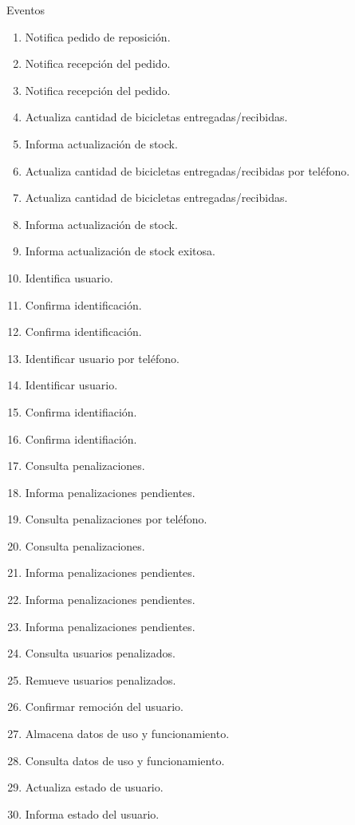 \begin{subsection}{Eventos}
\begin{enumerate}
	\item Notifica pedido de reposición.
	\item Notifica recepción del pedido.
	\item Notifica recepción del pedido.
	\item Actualiza cantidad de bicicletas entregadas/recibidas.
	\item Informa actualización de stock.
	\item Actualiza cantidad de bicicletas entregadas/recibidas por teléfono.
	\item Actualiza cantidad de bicicletas entregadas/recibidas.
	\item Informa actualización de stock.
	\item Informa actualización de stock exitosa.
	\item Identifica usuario.
	\item Confirma identificación.
	\item Confirma identificación.
	\item Identificar usuario por teléfono.
	\item Identificar usuario.
	\item Confirma identifiación.
	\item Confirma identifiación.
	\item Consulta penalizaciones.
	\item Informa penalizaciones pendientes.
	\item Consulta penalizaciones por teléfono.
	\item Consulta penalizaciones.
	\item Informa penalizaciones pendientes.
	\item Informa penalizaciones pendientes.
	\item Informa penalizaciones pendientes.
	\item Consulta usuarios penalizados.
	\item Remueve usuarios penalizados.
	\item Confirmar remoción del usuario.
	\item Almacena datos de uso y funcionamiento.
	\item Consulta datos de uso y funcionamiento.
	\item Actualiza estado de usuario.
	\item Informa estado del usuario.
	\end{enumerate}

\end{subsection}
